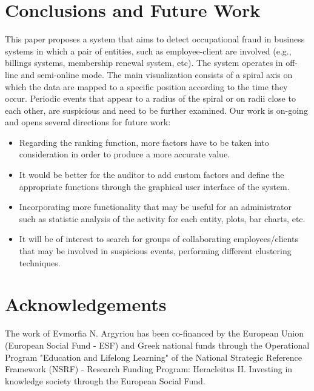 \documentclass[conference]{IEEEtran}
\begin{document}
\section{Conclusions and Future Work}
\label{sec:conclusions}

This paper proposes a system that aims to detect occupational fraud
in business systems in which a pair of entities, such as
employee-client are involved (e.g., billings systems, membership
renewal system, etc). The system operates in off-line and
semi-online mode. The main visualization consists of a spiral axis
on which the data are mapped to a specific position according to the
time they occur. Periodic events that appear to a radius of the
spiral or on radii close to each other, are suspicious and need to
be further examined. Our work is on-going and opens several
directions for future work:

\begin{itemize}
\item Regarding the ranking function, more factors have to
be taken into consideration in order to produce a more accurate
value.

\item It would be better for the auditor to add custom factors and define the appropriate functions through the
graphical user interface of the system.

\item Incorporating more functionality that may be useful for an
administrator such as statistic analysis of the activity for each
entity, plots, bar charts, etc.

\item It will be of interest to search for groups of collaborating employees/clients that
may be involved in suspicious events, performing different
clustering techniques.
\end{itemize}
\section*{Acknowledgements}

The work of Evmorfia N. Argyriou has been co-financed by the
European Union (European Social Fund - ESF) and Greek national funds
through the Operational Program "Education and Lifelong Learning" of
the National Strategic Reference Framework (NSRF) - Research Funding
Program: Heracleitus II. Investing in knowledge society through the
European Social Fund.







\end{document}
